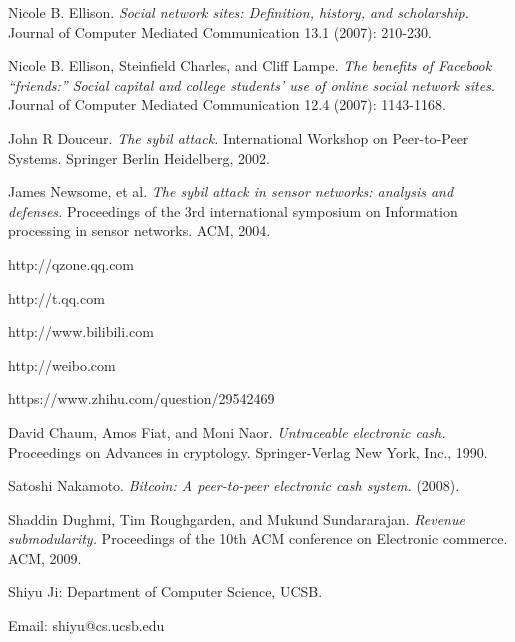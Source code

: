 \documentclass[12pt]{article}
\begin{document}
\begin{thebibliography}{19}
Nicole B. Ellison. \textit{Social network sites: Definition, history, and scholarship.} Journal of Computer Mediated Communication 13.1 (2007): 210-230.

Nicole B. Ellison, Steinfield Charles, and Cliff Lampe. \textit{The benefits of Facebook ``friends:'' Social capital and college students' use of online social network sites.} Journal of Computer Mediated Communication 12.4 (2007): 1143-1168.

John R Douceur. \textit{The sybil attack.} International Workshop on Peer-to-Peer Systems. Springer Berlin Heidelberg, 2002.

James Newsome, et al. \textit{The sybil attack in sensor networks: analysis and defenses.} Proceedings of the 3rd international symposium on Information processing in sensor networks. ACM, 2004.

http://qzone.qq.com

http://t.qq.com

http://www.bilibili.com

http://weibo.com

https://www.zhihu.com/question/29542469

David Chaum, Amos Fiat, and Moni Naor. \textit{Untraceable electronic cash.} Proceedings on Advances in cryptology. Springer-Verlag New York, Inc., 1990.

Satoshi Nakamoto. \textit{Bitcoin: A peer-to-peer electronic cash system.} (2008).

Shaddin Dughmi, Tim Roughgarden, and Mukund Sundararajan. \textit{Revenue submodularity.} Proceedings of the 10th ACM conference on Electronic commerce. ACM, 2009.
\end{thebibliography}

Shiyu Ji: Department of Computer Science, UCSB.

Email: shiyu@cs.ucsb.edu
\end{document}
